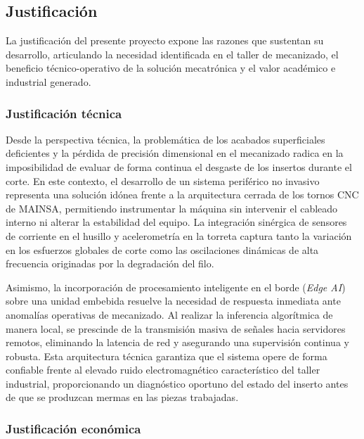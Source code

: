 \subsection{Justificación}
\label{subsec:justificacion}

La justificación del presente proyecto expone las razones que sustentan su desarrollo, articulando la necesidad identificada en el taller de mecanizado, el beneficio técnico-operativo de la solución mecatrónica y el valor académico e industrial generado.

\subsubsection{Justificación técnica}
\label{subsubsec:justificacion_tecnica}

Desde la perspectiva técnica, la problemática de los acabados superficiales deficientes y la pérdida de precisión dimensional en el mecanizado radica en la imposibilidad de evaluar de forma continua el desgaste de los insertos durante el corte. En este contexto, el desarrollo de un sistema periférico no invasivo representa una solución idónea frente a la arquitectura cerrada de los tornos CNC de MAINSA, permitiendo instrumentar la máquina sin intervenir el cableado interno ni alterar la estabilidad del equipo. La integración sinérgica de sensores de corriente en el husillo y acelerometría en la torreta captura tanto la variación en los esfuerzos globales de corte como las oscilaciones dinámicas de alta frecuencia originadas por la degradación del filo.

Asimismo, la incorporación de procesamiento inteligente en el borde (\textit{Edge AI}) sobre una unidad embebida resuelve la necesidad de respuesta inmediata ante anomalías operativas de mecanizado. Al realizar la inferencia algorítmica de manera local, se prescinde de la transmisión masiva de señales hacia servidores remotos, eliminando la latencia de red y asegurando una supervisión continua y robusta. Esta arquitectura técnica garantiza que el sistema opere de forma confiable frente al elevado ruido electromagnético característico del taller industrial, proporcionando un diagnóstico oportuno del estado del inserto antes de que se produzcan mermas en las piezas trabajadas.

\subsubsection{Justificación económica}
\label{subsubsec:justificacion_economica}

